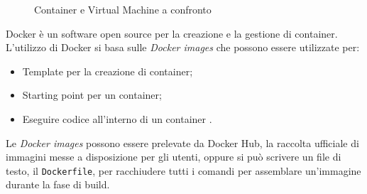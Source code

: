 \begin{figure}[ht]
    \centering
    \caption{Container e Virtual Machine a confronto}
    \label{fig:one}
\end{figure}

Docker è un software open source per la creazione e la gestione di container.\\
L'utilizzo di Docker si basa sulle \emph{Docker images} che possono essere utilizzate per:
\begin{itemize}
\item Template per la creazione di container;
\item Starting point per un container;
\item Eseguire codice all'interno di un container .
\end{itemize}

Le \emph{Docker images} possono essere prelevate da Docker Hub, la raccolta ufficiale di immagini messe a disposizione per gli utenti, oppure si può scrivere 
un file di testo, il \texttt{Dockerfile}, per racchiudere tutti i comandi per assemblare un'immagine durante la fase di build.


